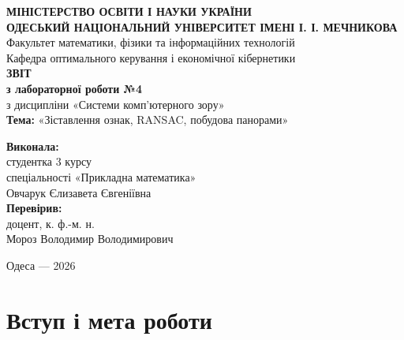 \documentclass[14pt, a4paper]{article}
\begin{document}
\begin{titlepage}
    \centering
    {\fontsize{14pt}{16pt}\selectfont \textbf{МІНІСТЕРСТВО ОСВІТИ І НАУКИ УКРАЇНИ}}\\[0.3em]
    {\fontsize{14pt}{16pt}\selectfont \textbf{ОДЕСЬКИЙ НАЦІОНАЛЬНИЙ УНІВЕРСИТЕТ ІМЕНІ І. І. МЕЧНИКОВА}}\\[0.3em]
    {\fontsize{14pt}{16pt}\selectfont Факультет математики, фізики та інформаційних технологій}\\[0.3em]
    {\fontsize{14pt}{16pt}\selectfont Кафедра оптимального керування і економічної кібернетики}\\[6em]

    {\fontsize{20pt}{24pt}\selectfont \textbf{ЗВІТ}}\\[1.2em]
    {\fontsize{16pt}{20pt}\selectfont \textbf{з лабораторної роботи №4}}\\[0.6em]
    {\fontsize{14pt}{18pt}\selectfont з дисципліни «Системи комп'ютерного зору»}\\[1.2em]
    {\fontsize{14pt}{18pt}\selectfont \textbf{Тема:} «Зіставлення ознак, RANSAC, побудова панорами»}\\[7em]

    \begin{flushright}
        \fontsize{14pt}{18pt}\selectfont
        \textbf{Виконала:}\\[0.2em]
        студентка 3 курсу\\[0.2em]
        спеціальності «Прикладна математика»\\[0.2em]
        Овчарук Єлизавета Євгеніївна\\[2em]

        \textbf{Перевірив:}\\[0.2em]
        доцент, к. ф.-м. н.\\[0.2em]
        Мороз Володимир Володимирович
    \end{flushright}

    \vfill
    {\fontsize{14pt}{16pt}\selectfont Одеса --- 2026}
\end{titlepage}

\newpage

\section*{Вступ і мета роботи}
\end{document}
